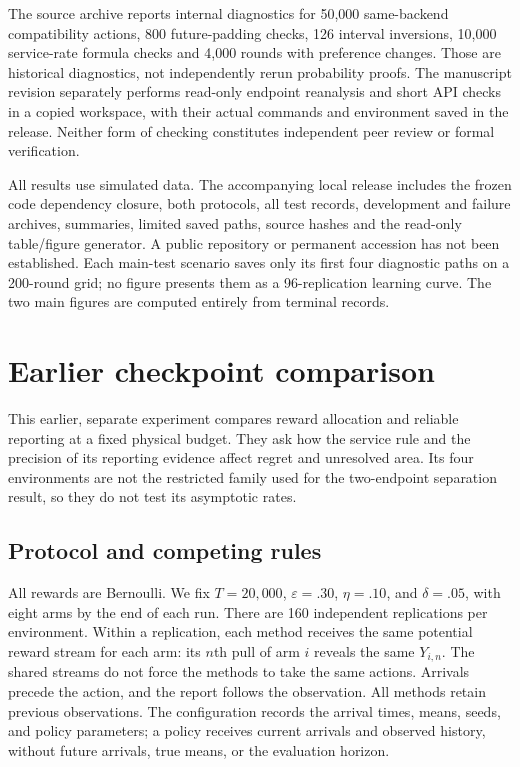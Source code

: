 \documentclass[11pt]{article}
\theoremstyle{remark}
\begin{document}
The source archive reports internal diagnostics for 50,000 same-backend compatibility actions, 800 future-padding checks, 126 interval inversions, 10,000 service-rate formula checks and 4,000 rounds with preference changes. Those are historical diagnostics, not independently rerun probability proofs. The manuscript revision separately performs read-only endpoint reanalysis and short API checks in a copied workspace, with their actual commands and environment saved in the release. Neither form of checking constitutes independent peer review or formal verification.

All results use simulated data. The accompanying local release includes the frozen code dependency closure, both protocols, all test records, development and failure archives, summaries, limited saved paths, source hashes and the read-only table/figure generator. A public repository or permanent accession has not been established. Each main-test scenario saves only its first four diagnostic paths on a 200-round grid; no figure presents them as a 96-replication learning curve. The two main figures are computed entirely from terminal records.
\section{Earlier checkpoint comparison}\label{sec:legacy-checkpoint-study}
\label{app:legacy-checkpoint}

This earlier, separate experiment compares reward allocation and reliable reporting at a fixed
physical budget. They ask how the service rule and the precision of its
reporting evidence affect regret and unresolved area. Its four environments
are not the restricted family used for the two-endpoint separation result,
so they do not test its asymptotic rates.

\subsection{Protocol and competing rules}

All rewards are Bernoulli. We fix $T=20{,}000$, $\varepsilon=.30$,
$\eta=.10$, and $\delta=.05$, with eight arms by the end of each run.
There are 160 independent replications per environment. Within a replication,
each method receives the same potential reward stream for each arm: its
$n$th pull of arm $i$ reveals the same $Y_{i,n}$. The shared streams do not
force the methods to take the same actions. Arrivals precede the action,
and the report follows the observation. All methods retain previous
observations. The configuration records the arrival times, means, seeds,
and policy parameters; a policy receives current arrivals and observed
history, without future arrivals, true means, or the evaluation horizon.
\end{document}
